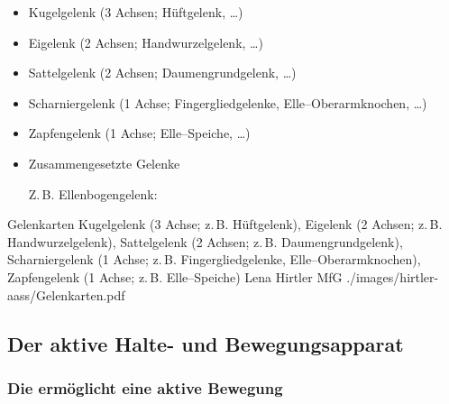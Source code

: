 {%
\begin{itemize}
    \item Kugelgelenk 
    (3 Achsen; Hüftgelenk, \ldots)
    \item Eigelenk 
    (2 Achsen; Handwurzelgelenk, \ldots)
    \item Sattelgelenk 
    (2 Achsen; Daumengrundgelenk, \ldots)
    \item Scharniergelenk 
    (1 Achse; Fingergliedgelenke, 
    Elle--Oberarmknochen, \ldots)
    \item Zapfengelenk 
    (1 Achse; Elle--Speiche, \ldots)
    \item Zusammengesetzte Gelenke
     
    Z.\,B. Ellenbogengelenk:
\end{itemize}}%




\Picture
{Gelenkarten}%
{ Kugel\-gelenk (3 Achse; z.\,B. Hüft\-gelenk),  
 Ei\-gelenk (2 Achsen; z.\,B. Hand\-wurzel\-gelenk),  
 Sattelgelenk (2 Achsen; z.\,B. Daumen\-grund\-ge\-lenk),  
 Scharniergelenk 
(1 Achse; z.\,B. Finger\-glied\-ge\-lenke, 
Elle--Ober\-arm\-kno\-chen),   
 Zapfengelenk (1 Achse; z.\,B. Elle--Speiche)}%
{}%
{Lena Hirtler}%
{MfG}%
{./images/hirtler-aass/Gelenkarten.pdf}%
{}%
{}%


\clearpage %
\subsection{Der aktive Halte- und Bewegungsapparat}

\subsubsection{Die  ermöglicht eine aktive Bewegung}
 
